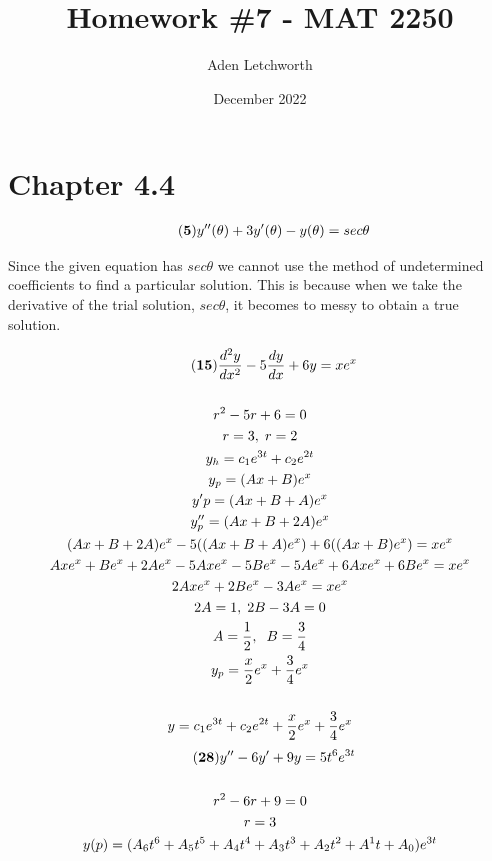 \documentclass{article}
\title{Homework \#7 - MAT 2250}
\author{Aden Letchworth}
\date{December 2022}
\begin{document}
\maketitle

\section*{Chapter 4.4}

\begin{gather*}\tag{\textbf{5}}
    y''(\theta) + 3y'(\theta)-y(\theta)=sec\theta \\
\end{gather*}
\begin{center}
    Since the given equation has $sec\theta$ we cannot use the method of undetermined coefficients to find a particular solution. This is because when we take the derivative of the trial solution, $ 
    sec \theta $, it becomes to messy to obtain a true solution.\\
\end{center}
\begin{gather*}\tag{\textbf{15}}
    \frac{d^2y}{dx^2}-5\frac{dy}{dx}+6y=xe^x\\\\
    r^2-5r+6=0\\
    r = 3, \hspace{.1cm}r = 2\\
    y_h = c_1e^{3t}+c_2e^{2t}\\
    y_p = (Ax+B)e^x\\
    y'p = (Ax+B+A)e^x\\
    y''_p = (Ax+B+2A)e^x\\
    (Ax+B+2A)e^x-5((Ax+B+A)e^x)+6((Ax+B)e^x) = xe^x\\
    Axe^x+Be^x+2Ae^x-5Axe^x-5Be^x-5Ae^x+6Axe^x+6Be^x = xe^x\\
    2Axe^x+2Be^x-3Ae^x=xe^x\\
    2A=1,\; 2B-3A=0\\
    A = \frac{1}{2},\hspace{.2cm} B = \frac{3}{4}\\
    y_p = \frac{x}{2}e^x+\frac{3}{4}e^x\\\\
    y = c_1e^{3t}+c_2e^{2t} + \frac{x}{2}e^x+\frac{3}{4}e^x
\end{gather*}
\newpage
\begin{gather*}\tag{\textbf{28}}
    y''-6y'+9y = 5t^6e^{3t}\\\\
    r^2-6r+9 = 0\\
    r = 3\\
    y(p) = (A_6t^6+A_5t^5+A_4t^4+A_3t^3+A_2t^2+A^1t+A_0)e^{3t}
\end{gather*}
\end{document}
